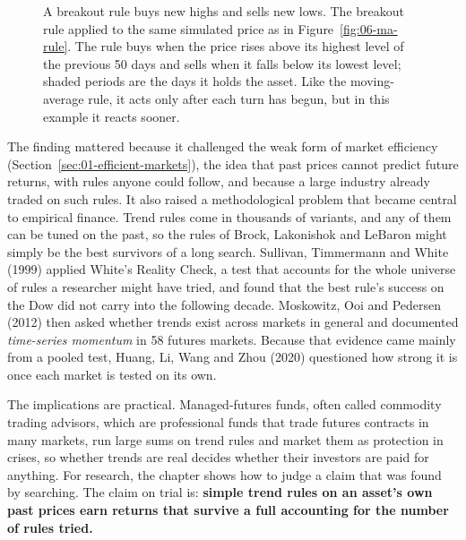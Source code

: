\begin{figure}[htbp]
\caption{A breakout rule buys new highs and sells new lows. The breakout rule applied to the same simulated price as in Figure~\ref{fig:06-ma-rule}. The rule buys when the price rises above its highest level of the previous 50 days and sells when it falls below its lowest level; shaded periods are the days it holds the asset. Like the moving-average rule, it acts only after each turn has begun, but in this example it reacts sooner.}
\label{fig:06-breakout-rule}
\end{figure}


The finding mattered because it challenged the weak form of market efficiency (Section~\ref{sec:01-efficient-markets}), the idea that past prices cannot predict future returns, with rules anyone could follow, and because a large industry already traded on such rules. It also raised a methodological problem that became central to empirical finance. Trend rules come in thousands of variants, and any of them can be tuned on the past, so the rules of Brock, Lakonishok and LeBaron might simply be the best survivors of a long search. Sullivan, Timmermann and White (1999) applied White's Reality Check, a test that accounts for the whole universe of rules a researcher might have tried, and found that the best rule's success on the Dow did not carry into the following decade. Moskowitz, Ooi and Pedersen (2012) then asked whether trends exist across markets in general and documented \emph{time-series momentum} in 58 futures markets. Because that evidence came mainly from a pooled test, Huang, Li, Wang and Zhou (2020) questioned how strong it is once each market is tested on its own.

The implications are practical. Managed-futures funds, often called commodity trading advisors, which are professional funds that trade futures contracts in many markets, run large sums on trend rules and market them as protection in crises, so whether trends are real decides whether their investors are paid for anything. For research, the chapter shows how to judge a claim that was found by searching. The claim on trial is: \textbf{simple trend rules on an asset's own past prices earn returns that survive a full accounting for the number of rules tried.}

